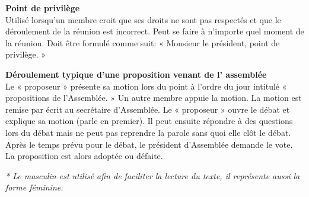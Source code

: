 \begin{multicols}{2}
\bigskip
\noindent
\textbf{Point de privilège}\\
Utilisé lorsqu'un membre croit que ses droits ne sont pas respectés et que le déroulement de la
réunion est incorrect. Peut se faire à n'importe quel moment de la réunion. Doit être formulé comme suit: « Monsieur le président, point de privilège. »

\bigskip
\noindent
\textbf{Déroulement typique d'une proposition venant de l’ assemblée}\\
Le « proposeur » présente sa motion lors du point à l'ordre du jour intitulé « propositions de l'Assemblée. » Un autre membre appuie la motion. La motion est remise par écrit au secrétaire d'Assemblée. Le « proposeur » ouvre le débat et explique sa motion (parle en premier). Il peut ensuite répondre à des questions lors du débat mais ne peut pas reprendre la parole sans quoi elle clôt le débat.  Après le temps prévu pour le débat, le président d'Assemblée demande le vote. La proposition est alors adoptée ou défaite.\\
\end{multicols}
\textit{* Le masculin est utilisé afin de faciliter la lecture du texte, il représente aussi la forme féminine.}
\newpage
